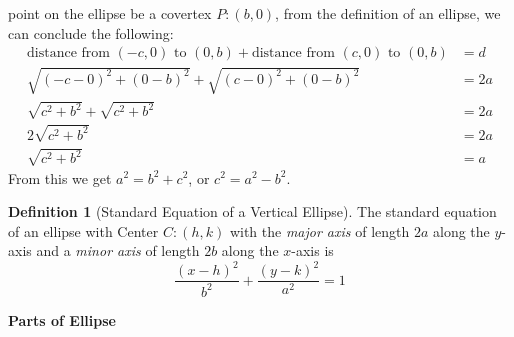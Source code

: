 \documentclass[a4paper]{article}
\theoremstyle{definition}
\newtheorem*{defi}{Definition}
\begin{document}
point on the ellipse be a covertex $P:(b,0)$, from the definition of an ellipse,
we can conclude the following:
\begin{align*}
     \text{distance from $(-c,0)$ to $(0,b)$} + 
     \text{distance from $(c,0)$ to $(0,b)$} &= d \\[1.25ex]
     \sqrt{(-c-0)^2+(0-b)^2} + \sqrt{(c-0)^2+(0-b)^2} &= 2a \\[1.25ex]
     \sqrt{c^2+b^2}+\sqrt{c^2+b^2} &= 2a \\[1.25ex]
     2\sqrt{c^2+b^2} &= 2a \\[1.25ex]
     \sqrt{c^2+b^2} &= a
\end{align*}
From this we get $a^2=b^2+c^2$, or $c^2=a^2-b^2$.
\begin{defi}[Standard Equation of a Vertical Ellipse]
    The standard equation of an ellipse with Center $C:(h,k)$ with the
      \emph{major axis} of length $2a$ along the $y$-axis  and a \emph{minor
      axis} of length $2b$ along the $x$-axis is
      \begin{equation*}
           \dfrac{(x-h)^2}{b^2}+\dfrac{(y-k)^2}{a^2}=1
      \end{equation*}
\end{defi}
\textbf{Parts of Ellipse}
\end{document}
